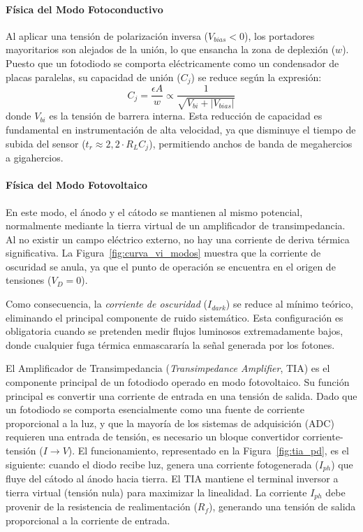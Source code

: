 \paragraph{Física del Modo Fotoconductivo}
Al aplicar una tensión de polarización inversa ($V_{bias} < 0$), los portadores mayoritarios son alejados de la unión, lo que ensancha la zona de deplexión ($w$). Puesto que un fotodiodo se comporta eléctricamente como un condensador de placas paralelas, su capacidad de unión ($C_j$) se reduce según la expresión:
\begin{equation}\label{eq:capacidad_union}
    C_j = \frac{\epsilon A}{w} \propto \frac{1}{\sqrt{V_{bi} + |V_{bias}|}}
\end{equation}
donde $V_{bi}$ es la tensión de barrera interna. Esta reducción de capacidad es fundamental en instrumentación de alta velocidad, ya que disminuye el tiempo de subida del sensor ($t_r \approx 2,2 \cdot R_L C_j$), permitiendo anchos de banda de megahercios a gigahercios.

\paragraph{Física del Modo Fotovoltaico}
En este modo, el ánodo y el cátodo se mantienen al mismo potencial, normalmente mediante la tierra virtual de un amplificador de transimpedancia. Al no existir un campo eléctrico externo, no hay una corriente de deriva térmica significativa. La Figura~\ref{fig:curva_vi_modos} muestra que la corriente de oscuridad se anula, ya que el punto de operación se encuentra en el origen de tensiones ($V_D = 0$).


Como consecuencia, la \emph{corriente de oscuridad} ($I_{dark}$) se reduce al mínimo teórico, eliminando el principal componente de ruido sistemático. Esta configuración es obligatoria cuando se pretenden medir flujos luminosos extremadamente bajos, donde cualquier fuga térmica enmascararía la señal generada por los fotones.


El Amplificador de Transimpedancia (\emph{Transimpedance Amplifier}, TIA) es el componente principal de un fotodiodo operado en modo fotovoltaico. Su función principal es convertir una corriente de entrada en una tensión de salida. Dado que un fotodiodo se comporta esencialmente como una fuente de corriente proporcional a la luz, y que la mayoría de los sistemas de adquisición (ADC) requieren una entrada de tensión, es necesario un bloque convertidor corriente-tensión ($I \to V$). El funcionamiento, representado en la Figura~\ref{fig:tia_pd}, es el siguiente: cuando el diodo recibe luz, genera una corriente fotogenerada ($I_{ph}$) que fluye del cátodo al ánodo hacia tierra. El TIA mantiene el terminal inversor a tierra virtual (tensión nula) para maximizar la linealidad. La corriente $I_{ph}$ debe provenir de la resistencia de realimentación ($R_f$), generando una tensión de salida proporcional a la corriente de entrada.


